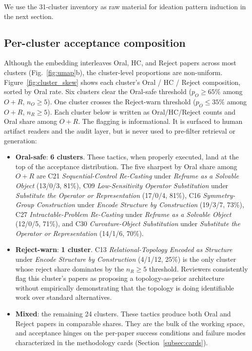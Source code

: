 \documentclass[10pt,a4paper]{article}
\begin{document}
We use the 31-cluster inventory as raw material for ideation pattern induction in the next section.

\subsection{Per-cluster acceptance composition}
\label{subsec:clusterskew}

Although the embedding interleaves Oral, HC, and Reject papers across most clusters (Fig.~\ref{fig:umap}b), the cluster-level proportions are non-uniform. Figure~\ref{fig:cluster_skew} shows each cluster's Oral / HC / Reject composition, sorted by Oral rate. Six clusters clear the Oral-safe threshold ($p_O{\geq}65\%$ among $O{+}R$, $n_O{\geq}5$). One cluster crosses the Reject-warn threshold ($p_O{\leq}35\%$ among $O{+}R$, $n_R{\geq}5$). Each cluster below is written as Oral/HC/Reject counts and Oral share among $O{+}R$. The flagging is informational. It is surfaced to human artifact readers and the audit layer, but is never used to pre-filter retrieval or generation:

\begin{itemize}[leftmargin=1.4em, topsep=2pt, itemsep=2pt]
\item \textbf{Oral-safe}: \textbf{6 clusters}. These tactics, when properly executed, land at the top of the acceptance distribution. The five sharpest by Oral share among $O{+}R$ are C21 \emph{Sequential-Control Re-Casting} under \emph{Reframe as a Solvable Object} (13/0/3, 81\%), C09 \emph{Low-Sensitivity Operator Substitution} under \emph{Substitute the Operator or Representation} (17/0/4, 81\%), C16 \emph{Symmetry-Group Construction} under \emph{Encode Structure by Construction} (19/3/7, 73\%), C27 \emph{Intractable-Problem Re-Casting} under \emph{Reframe as a Solvable Object} (12/0/5, 71\%), and C30 \emph{Curvature-Object Substitution} under \emph{Substitute the Operator or Representation} (14/1/6, 70\%).
\item \textbf{Reject-warn}: \textbf{1 cluster}. C13 \emph{Relational-Topology Encoded as Structure} under \emph{Encode Structure by Construction} (4/1/12, 25\%) is the only cluster whose reject share dominates by the $n_R{\geq}5$ threshold. Reviewers consistently flag this cluster's papers as proposing a topology-as-prior architecture without empirically demonstrating that the topology is doing identifiable work over standard alternatives.
\item \textbf{Mixed}: the remaining 24 clusters. These tactics produce both Oral and Reject papers in comparable shares. They are the bulk of the working space, and acceptance hinges on the per-paper success conditions and failure modes characterized in the methodology cards (Section~\ref{subsec:cards}).
\end{itemize}
\end{document}
